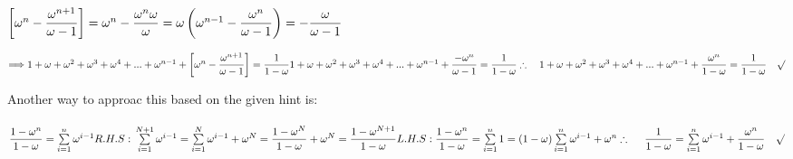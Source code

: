 \documentclass[fleqn]{article}
\begin{document}
\begin{enumerate}
      \textcolor{extra}{
        $
          \left[\omega^n-\dfrac{\omega^{n+1}}{\omega-1}\right]=\omega^n-\dfrac{\omega^n \omega}{\omega}
          =\omega \left(\omega^{n-1}-\dfrac{\omega^n}{\omega-1}\right)=-\dfrac{\omega}{\omega-1} \\ \\ \\
        $
      }

      \textcolor{hwColor}{
        $
          \Longrightarrow 1+\omega+\omega^2+\omega^3+\omega^4+...+\omega^{n-1}+\left[\omega^n-\dfrac{\omega^{n+1}}{\omega-1}\right]=\dfrac{1}{1-\omega}
          \\
          \\
          1+\omega+\omega^2+\omega^3+\omega^4+...+\omega^{n-1}+\dfrac{-\omega^n}{\omega-1}=\dfrac{1}{1-\omega}
          \\
          \\
          \\
          \therefore ~~~ 1+\omega+\omega^2+\omega^3+\omega^4+...+\omega^{n-1}+\dfrac{\omega^n}{1-\omega}=\dfrac{1}{1-\omega} ~~~ \surd
          \\
          \\
        $
      }

      \pagebreak

      \textcolor{hwColor}{
        Another way to approac this based on the given hint is: \\
        \\
        $
          \dfrac{1-\omega^n}{1-\omega}=\sum\limits_{i=1}^{n} \omega^{i-1} \\
          \\
          R.H.S: \\
          \sum\limits_{i=1}^{N+1} \omega^{i-1}=\sum\limits_{i=1}^{N} \omega^{i-1}+\omega^N=\dfrac{1-\omega^N}{1-\omega}+\omega^N=\dfrac{1-\omega^{N+1}}{1-\omega} \\
          \\
          \\
          \\
          L.H.S: \\
          \dfrac{1-\omega^n}{1-\omega}=\sum\limits_{i=1}^{n} \\
          \\
          1=(1-\omega) \sum\limits_{i=1}^{n} \omega^{i-1}+\omega^n \\
          \\
          \\
          \therefore ~~~~ \dfrac{1}{1-\omega}=\sum\limits_{i=1}^{n} \omega^{i-1}+\dfrac{\omega^n}{1-\omega} ~~~ \surd
        $
      }



\end{enumerate}
\end{document}

